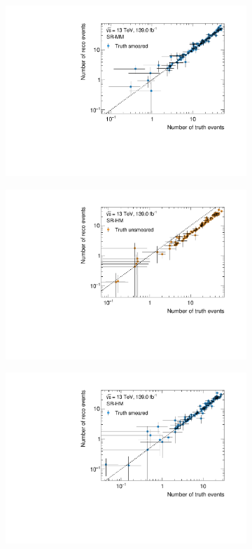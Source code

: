 \begin{figure}
\begin{subfigure}[b]{0.49\linewidth}
	\end{subfigure}\hfill
	\begin{subfigure}[b]{0.49\linewidth}
		\centering\includegraphics[width=\textwidth]{yields_SR-MM_smeared}
	\end{subfigure}\hfill
	\begin{subfigure}[b]{0.49\linewidth}
		\centering\includegraphics[width=\textwidth]{yields_SR-HM_unsmeared}
	\end{subfigure}\hfill
	\begin{subfigure}[b]{0.49\linewidth}
		\centering\includegraphics[width=\textwidth]{yields_SR-HM_smeared}

\end{subfigure}
\end{figure}
